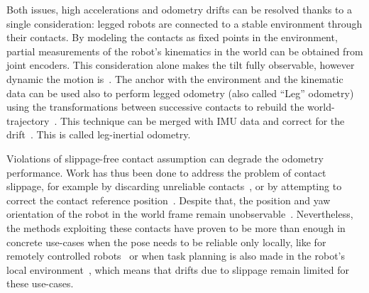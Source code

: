 \documentclass{IJCAS}
\begin{document}
Both issues, high accelerations and odometry drifts can be resolved thanks to a single consideration: legged robots are connected to a stable environment through their contacts. By modeling the contacts as fixed points in the environment, partial measurements of the robot's kinematics in the world can be obtained from joint encoders. This consideration alone makes the tilt fully observable, however dynamic the motion is~\cite{benallegue2020LyapunovStableOrientationEstimatorHumanoids}. The anchor with the environment and the kinematic data can be used also to perform legged odometry (also called ``Leg'' odometry) using the transformations between successive contacts to rebuild the world-trajectory~\cite{Lin2005ALegConfigurationMeasSystemHexapod}. This technique can be merged with IMU data and correct for the drift~\cite{bloesch2013FusionLegKineAndImu, masuya2015DeadReckoningAnchoringPivot}. This is called leg-inertial odometry.

Violations of slippage-free contact assumption can degrade the odometry performance. Work has thus been done to address the problem of contact slippage, for example by discarding unreliable contacts~\cite{maravgakis2023probabilistic,yoon2023InvariantSmootherDynamicContactEventInformation}, or by attempting to correct the contact reference position~\cite{bloesch2013FusionLegKineAndImu,Hartley2020RIEKF, Demont2024KineticsObserver}. Despite that, the position and yaw orientation of the robot in the world frame remain unobservable~\cite{bloesch2013FusionLegKineAndImu}. Nevertheless, the methods exploiting these contacts have proven to be more than enough in concrete use-cases when the pose needs to be reliable only locally, like for remotely controlled robots~\cite{Grandia2024DesignControlBipedalRoboticCharacter} or when task planning is also made in the robot's local environment~\cite{Tsuru2023OnlineMulticontactReplanningHumanoid}, which means that drifts due to slippage remain limited for these use-cases.
\end{document}
